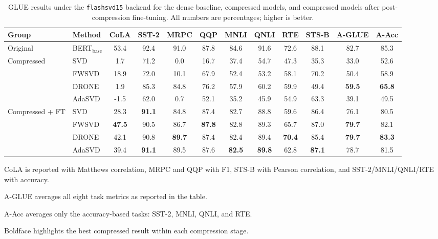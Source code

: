 \begin{table}[t]
\centering
\small
\renewcommand{\arraystretch}{1.10}
\setlength{\tabcolsep}{2pt}
\begin{threeparttable}
\caption{
GLUE results under the \texttt{flashsvd15} backend for the dense baseline, compressed models, and compressed models after post-compression fine-tuning.
All numbers are percentages; higher is better.
}
\label{tab:glue_main_flashsvd15}
\begin{tabular}{llcccccccccc}
\toprule
Group & Method & CoLA & SST-2 & MRPC & QQP & MNLI & QNLI & RTE & STS-B & A-GLUE & A-Acc \\
\midrule
Original
& BERT$_{\mathrm{base}}$
& 53.4 & 92.4 & 91.0 & 87.8 & 84.6 & 91.6 & 72.6 & 88.1 & 82.7 & 85.3 \\
\midrule
\multirow{4}{*}{Compressed}
& SVD
& 1.7 & 71.2 & 0.0 & 16.7 & 37.4 & 54.7 & 47.3 & 35.3 & 33.0 & 52.6 \\
& FWSVD
& 18.9 & 72.0 & 10.1 & 67.9 & 52.4 & 53.2 & 58.1 & 70.2 & 50.4 & 58.9 \\
& DRONE
& 1.9 & 85.3 & 84.8 & 76.2 & 57.9 & 60.2 & 59.9 & 49.4 & \textbf{59.5} & \textbf{65.8} \\
& AdaSVD
& -1.5 & 62.0 & 0.7 & 52.1 & 35.2 & 45.9 & 54.9 & 63.3 & 39.1 & 49.5 \\
\midrule
\multirow{4}{*}{Compressed + FT}
& SVD
& 28.3 & \textbf{91.1} & 84.8 & 87.4 & 82.7 & 88.8 & 59.6 & 86.4 & 76.1 & 80.5 \\
& FWSVD
& \textbf{47.5} & 90.5 & 86.7 & \textbf{87.8} & 82.8 & 89.3 & 65.7 & 87.0 & \textbf{79.7} & 82.1 \\
& DRONE
& 42.1 & 90.8 & \textbf{89.7} & 87.4 & 82.4 & 89.4 & \textbf{70.4} & 85.4 & \textbf{79.7} & \textbf{83.3} \\
& AdaSVD
& 39.4 & \textbf{91.1} & 89.5 & 87.6 & \textbf{82.5} & \textbf{89.8} & 62.8 & \textbf{87.1} & 78.7 & 81.5 \\
\bottomrule
\end{tabular}
\begin{tablenotes}[flushleft]
\footnotesize
\item CoLA is reported with Matthews correlation, MRPC and QQP with F1, STS-B with Pearson correlation, and SST-2/MNLI/QNLI/RTE with accuracy.
\item A-GLUE averages all eight task metrics as reported in the table.
\item A-Acc averages only the accuracy-based tasks: SST-2, MNLI, QNLI, and RTE.
\item Boldface highlights the best compressed result within each compression stage.
\end{tablenotes}
\end{threeparttable}
\end{table}
